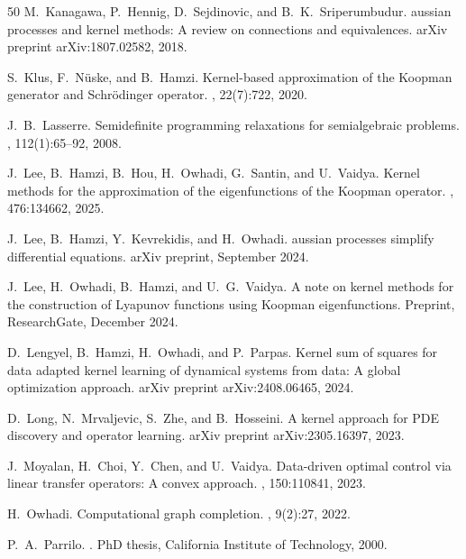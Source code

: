 \documentclass[11pt]{article}
\begin{document}
\begin{thebibliography}{50}
M.~Kanagawa, P.~Hennig, D.~Sejdinovic, and B.~K.~Sriperumbudur.
aussian processes and kernel methods: A review on connections and equivalences.
\newblock arXiv preprint arXiv:1807.02582, 2018.

S.~Klus, F.~N\"uske, and B.~Hamzi.
\newblock Kernel-based approximation of the {K}oopman generator and {S}chr\"odinger operator.
, 22(7):722, 2020.

J.~B.~Lasserre.
\newblock Semidefinite programming relaxations for semialgebraic problems.
, 112(1):65--92, 2008.

J.~Lee, B.~Hamzi, B.~Hou, H.~Owhadi, G.~Santin, and U.~Vaidya.
\newblock Kernel methods for the approximation of the eigenfunctions of the {K}oopman operator.
, 476:134662, 2025.

J.~Lee, B.~Hamzi, Y.~Kevrekidis, and H.~Owhadi.
aussian processes simplify differential equations.
\newblock arXiv preprint, September 2024.

J.~Lee, H.~Owhadi, B.~Hamzi, and U.~G.~Vaidya.
\newblock A note on kernel methods for the construction of {L}yapunov functions using {K}oopman eigenfunctions.
\newblock Preprint, ResearchGate, December 2024.

D.~Lengyel, B.~Hamzi, H.~Owhadi, and P.~Parpas.
\newblock Kernel sum of squares for data adapted kernel learning of dynamical systems from data: A global optimization approach.
\newblock arXiv preprint arXiv:2408.06465, 2024.

D.~Long, N.~Mrvaljevic, S.~Zhe, and B.~Hosseini.
\newblock A kernel approach for {PDE} discovery and operator learning.
\newblock arXiv preprint arXiv:2305.16397, 2023.

J.~Moyalan, H.~Choi, Y.~Chen, and U.~Vaidya.
\newblock Data-driven optimal control via linear transfer operators: A convex approach.
, 150:110841, 2023.

H.~Owhadi.
\newblock Computational graph completion.
, 9(2):27, 2022.

P.~A.~Parrilo.
.
\newblock PhD thesis, California Institute of Technology, 2000.


\end{thebibliography}
\end{document}
